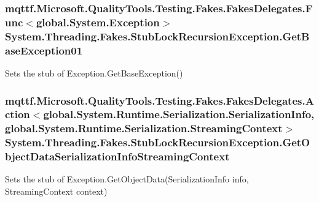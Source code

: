 \hypertarget{class_system_1_1_threading_1_1_fakes_1_1_stub_lock_recursion_exception_a0a8a4393b05fa1b2a03b82e0f80d05f1}{
\subsubsection[{Get\-Base\-Exception01}]{\setlength{\rightskip}{0pt plus 5cm}mqttf.\-Microsoft.\-Quality\-Tools.\-Testing.\-Fakes.\-Fakes\-Delegates.\-Func$<$global.\-System.\-Exception$>$ System.\-Threading.\-Fakes.\-Stub\-Lock\-Recursion\-Exception.\-Get\-Base\-Exception01}}\label{class_system_1_1_threading_1_1_fakes_1_1_stub_lock_recursion_exception_a0a8a4393b05fa1b2a03b82e0f80d05f1}


Sets the stub of Exception.\-Get\-Base\-Exception()

\hypertarget{class_system_1_1_threading_1_1_fakes_1_1_stub_lock_recursion_exception_a0e858e597bcdd635362a75dafaacff84}{
\subsubsection[{Get\-Object\-Data\-Serialization\-Info\-Streaming\-Context}]{\setlength{\rightskip}{0pt plus 5cm}mqttf.\-Microsoft.\-Quality\-Tools.\-Testing.\-Fakes.\-Fakes\-Delegates.\-Action$<$global.\-System.\-Runtime.\-Serialization.\-Serialization\-Info, global.\-System.\-Runtime.\-Serialization.\-Streaming\-Context$>$ System.\-Threading.\-Fakes.\-Stub\-Lock\-Recursion\-Exception.\-Get\-Object\-Data\-Serialization\-Info\-Streaming\-Context}}\label{class_system_1_1_threading_1_1_fakes_1_1_stub_lock_recursion_exception_a0e858e597bcdd635362a75dafaacff84}


Sets the stub of Exception.\-Get\-Object\-Data(\-Serialization\-Info info, Streaming\-Context context)

